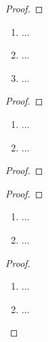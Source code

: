 \documentclass[12pt]{scrreprt}
\begin{document}
\begin{satz}\label{}

\end{satz}
\begin{proof}

\end{proof}

\begin{dfn}\label{}

\end{dfn}

\begin{bem}\label{}
\begin{enumerate}
\item ...
\item ...
\item ...
\end{enumerate}
\end{bem}

\begin{kor}\label{}

\end{kor}
\begin{proof}

\end{proof}

\begin{satz}\label{}
\begin{enumerate}
\item ...
\item ...
\end{enumerate}
\end{satz}
\begin{bem*}

\end{bem*}
\begin{proof}

\end{proof}

\begin{bsp}\label{}

\end{bsp}
\begin{proof}

\end{proof}

\begin{kor}\label{}
\begin{enumerate}
\item ...
\item ...
\end{enumerate}
\end{kor}
\begin{bem*}

\end{bem*}
\begin{proof}
\begin{enumerate}
\item ...
\item ...
\end{enumerate}
\end{proof}
\end{document}
